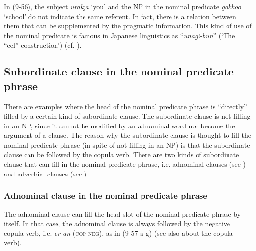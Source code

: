 In (9-56), the subject \textit{urakja} ‘you’ and the NP in the nominal predicate \textit{gakkoo} ‘school’ do not indicate the same referent. In fact, there is a relation between them that can be supplemented by the pragmatic information. This kind of use of the nominal predicate is famous in Japanese linguistics as “\textit{unagi-bun}” (‘The “eel” construction’) (cf. \citealt{Okutsu1978}).

\subsection{Subordinate clause in the nominal predicate phrase}\label{sec:9.3.2}

There are examples where the head of the nominal predicate phrase is “directly” filled by a certain kind of subordinate clause. The subordinate clause is not filling in an NP, since it cannot be modified by an adnominal word nor become the argument of a clause. The reason why the subordinate clause is thought to fill the nominal predicate phrase (in spite of not filling in an NP) is that the subordinate clause can be followed by the copula verb. There are two kinds of subordinate clause that can fill in the nominal predicate phrase, i.e. adnominal clauses (see ) and adverbial clauses (see ).

\subsubsection{Adnominal clause in the nominal predicate phrase}\label{sec:9.3.2.1}

The adnominal clause can fill the head slot of the nominal predicate phrase by itself. In that case, the adnominal clause is always followed by the negative copula verb, i.e. \textit{ar-an} (\textsc{cop}-\textsc{neg}), as in (9-57 a-g) (see also  about the copula verb).

